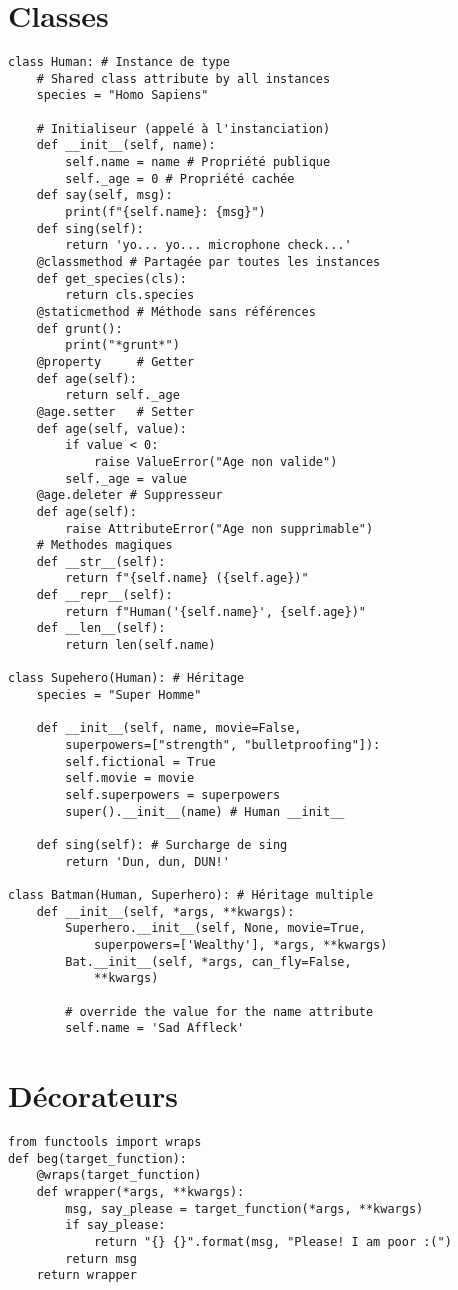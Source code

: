 \documentclass[9pt]{extarticle}
\begin{document}
\begin{multicols*}{4}
\section*{Classes}
\begin{lstlisting}
class Human: # Instance de type
    # Shared class attribute by all instances
    species = "Homo Sapiens"

    # Initialiseur (appelé à l'instanciation)
    def __init__(self, name):
        self.name = name # Propriété publique
        self._age = 0 # Propriété cachée
    def say(self, msg):
        print(f"{self.name}: {msg}")
    def sing(self):
        return 'yo... yo... microphone check...'
    @classmethod # Partagée par toutes les instances
    def get_species(cls):
        return cls.species
    @staticmethod # Méthode sans références
    def grunt():
        print("*grunt*")
    @property     # Getter
    def age(self):
        return self._age
    @age.setter   # Setter
    def age(self, value):
        if value < 0:
            raise ValueError("Age non valide")
        self._age = value
    @age.deleter # Suppresseur
    def age(self):
        raise AttributeError("Age non supprimable")
    # Methodes magiques
    def __str__(self):
        return f"{self.name} ({self.age})"
    def __repr__(self):
        return f"Human('{self.name}', {self.age})"
    def __len__(self):
        return len(self.name)

class Supehero(Human): # Héritage
    species = "Super Homme"

    def __init__(self, name, movie=False,
        superpowers=["strength", "bulletproofing"]):
        self.fictional = True
        self.movie = movie
        self.superpowers = superpowers
        super().__init__(name) # Human __init__

    def sing(self): # Surcharge de sing
        return 'Dun, dun, DUN!'

class Batman(Human, Superhero): # Héritage multiple
    def __init__(self, *args, **kwargs):
        Superhero.__init__(self, None, movie=True,
            superpowers=['Wealthy'], *args, **kwargs)
        Bat.__init__(self, *args, can_fly=False,
            **kwargs)

        # override the value for the name attribute
        self.name = 'Sad Affleck'
\end{lstlisting}

\section*{Décorateurs}
\begin{lstlisting}
from functools import wraps
def beg(target_function):
    @wraps(target_function)
    def wrapper(*args, **kwargs):
        msg, say_please = target_function(*args, **kwargs)
        if say_please:
            return "{} {}".format(msg, "Please! I am poor :(")
        return msg
    return wrapper


\end{lstlisting}
\end{multicols*}
\end{document}
